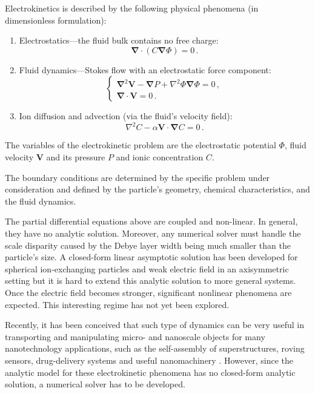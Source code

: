 \documentclass[12pt]{article}
\providecommand\Laplacian{\nabla^2}
\providecommand\bnabla{\boldsymbol{\nabla}}
\providecommand\bLaplacian{\boldsymbol{\nabla}^2}
\providecommand\bV{\boldsymbol{V}}
\begin{document}
Electrokinetics is described by the following physical phenomena (in dimensionless formulation):
\begin{enumerate}
\item Electrostatics---the fluid bulk contains no free
charge:
\begin{equation} \label{eq:Laplace}
    \bnabla \cdot (C \bnabla \varPhi) = 0 \, .
\end{equation}
\item Fluid dynamics---Stokes flow with an electrostatic force
component:
\begin{equation} \label{eq:Stokes}
\left\{ \begin{array}{l}
\bLaplacian \bV - \bnabla P + \Laplacian \varPhi \bnabla \varPhi = 0 \, , \\
\bnabla \cdot \bV = 0 \, . \end{array} \right.
\end{equation}
\item Ion diffusion and advection (via the fluid's velocity field):
\begin{equation} \label{eq:Nernst}
\Laplacian C - \alpha \bV \cdot \bnabla C = 0 \, .
\end{equation}
\end{enumerate}
The variables of the electrokinetic problem are the electrostatic
potential $\varPhi$, fluid velocity $\bV$ and its pressure $P$ and
ionic concentration $C$.

The boundary conditions are determined by the specific
problem under consideration and defined by the particle's
geometry, chemical characteristics, and the fluid dynamics.

The partial differential equations above are coupled and
non-linear. In general, they have no analytic solution. Moreover,
any numerical solver must handle the scale disparity caused by the
Debye layer width being much smaller than the particle's size. A
closed-form linear asymptotic solution has been developed for
spherical ion-exchanging particles and weak electric field in an
axisymmetric setting \cite{yariv2010migration} but it is hard to extend this
analytic solution to more general systems. Once the electric field
becomes stronger, significant nonlinear phenomena are expected.
This interesting regime has not yet been explored.

Recently, it has been conceived that such type of dynamics
can be very useful in transporting and manipulating micro-
and nanoscale objects for many nanotechnology applications,
such as the self-assembly of superstructures, roving sensors, 
drug-delivery systems and useful nanomachinery 
\cite{pumera2010electrochemically}.
However, since the analytic model for these electrokinetic
phenomena has no closed-form analytic solution, a numerical
solver has to be developed.
\end{document}

